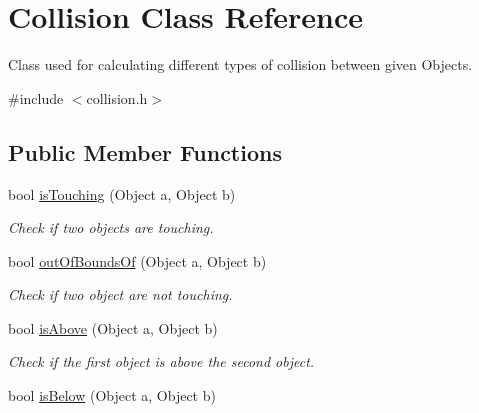 \hypertarget{classCollision}{}\section{Collision Class Reference}
\label{classCollision}


Class used for calculating different types of collision between given Objects.  




{\ttfamily \#include $<$collision.\+h$>$}

\subsection*{Public Member Functions}
\begin{DoxyCompactItemize}
\item 
bool \hyperlink{classCollision_ae005eb1d857f6127b2673aecacbbd03f}{is\+Touching} (Object a, Object b)\hypertarget{classCollision_ae005eb1d857f6127b2673aecacbbd03f}{}\label{classCollision_ae005eb1d857f6127b2673aecacbbd03f}

\begin{DoxyCompactList}\small\item\em Check if two objects are touching. \end{DoxyCompactList}\item 
bool \hyperlink{classCollision_a4fae301767751ae007e953d1d2f49e7b}{out\+Of\+Bounds\+Of} (Object a, Object b)\hypertarget{classCollision_a4fae301767751ae007e953d1d2f49e7b}{}\label{classCollision_a4fae301767751ae007e953d1d2f49e7b}

\begin{DoxyCompactList}\small\item\em Check if two object are not touching. \end{DoxyCompactList}\item 
bool \hyperlink{classCollision_aecbf1758ca3a93a39568dbdf87213f20}{is\+Above} (Object a, Object b)\hypertarget{classCollision_aecbf1758ca3a93a39568dbdf87213f20}{}\label{classCollision_aecbf1758ca3a93a39568dbdf87213f20}

\begin{DoxyCompactList}\small\item\em Check if the first object is above the second object. \end{DoxyCompactList}\item 
bool \hyperlink{classCollision_ad5414ecc098c7d63155aea827c7d68b1}{is\+Below} (Object a, Object b)\hypertarget{classCollision_ad5414ecc098c7d63155aea827c7d68b1}{}\label{classCollision_ad5414ecc098c7d63155aea827c7d68b1}


\end{DoxyCompactItemize}
